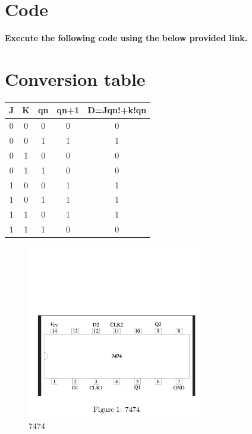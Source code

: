 \documentclass[jornal,10pt,twocolumn]{article}
\begin{document}
\section{Code}
\textbf{Execute the following code using the below provided link.}\\
\begin{center}
\end{center}

\section{Conversion table}

    \centering
    \begin{tabular}{ |c |c |c |c |c |}
\hline
\newline
\textbf{J} & \textbf{K} & \textbf{qn} & \textbf{qn+1} & \textbf{D=Jqn!+k!qn} \\
\hline
 0 & 0 & 0 &0 &0\\  
 0 & 0 & 1 &1 &1\\ 
 0 & 1 & 0 &0 &0\\ 
 0 & 1 & 1 &0 &0\\ 
 1 & 0 & 0 &1 &1\\ 
 1 & 0 & 1 &1 &1\\ 
 1 & 1 & 0 &1 &1\\ 
 1 & 1 & 1 &0 &0\\ 
 \hline
 \end{tabular}
\label{conversion table}
\begin{figure}
	\centering																	   		
	\includegraphics[width=3in]{IC.png}
	\caption{7474}
	\label{fig:circuit}	
\end{figure}
\end{document}
